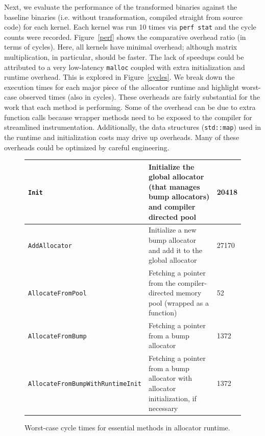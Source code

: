 \documentclass{article}
\begin{document}
Next, we evaluate the performance of the transformed binaries against the baseline binaries (i.e.
without transformation, compiled straight from source code) for each kernel. Each kernel was 
run 10 times via \texttt{perf stat} and the cycle counts were recorded. Figure~\ref{perf} shows the 
comparative overhead ratio (in terms of cycles). Here, all kernels have minimal overhead; although
matrix multiplication, in particular, should be faster. The lack of speedups could be attributed
to a very low-latency \texttt{malloc} coupled with extra initialization and runtime overhead. This
is explored in Figure~\ref{cycles}. We break down the execution times for each major piece of the 
allocator runtime and highlight worst-case observed times (also in cycles). These overheads are
fairly substantial for the work that each method is performing. Some of the overhead can be due
to extra function calls because wrapper methods need to be exposed to the compiler for streamlined
instrumentation. Additionally, the data structures (\texttt{std::map}) used in the runtime and 
initialization costs may drive up overheads. Many of these overheads could be optimized by 
careful engineering.

\begin{figure} [htp]
        \small
        \centering
        \begin{tabular}{ | m{5cm} | m{9cm} | m{1cm} | } 
          \hline
            \texttt{Init} & Initialize the global allocator (that manages bump allocators) and compiler directed pool & 20418 \\ 
          \hline
            \texttt{AddAllocator} & Initialize a new bump allocator and add it to the global allocator & 27170 \\ 
          \hline
            \texttt{AllocateFromPool} & Fetching a pointer from the compiler-directed memory pool (wrapped as a function) & 52 \\ 
          \hline
            \texttt{AllocateFromBump} & Fetching a pointer from a bump allocator & 1372 \\ 
          \hline
            \texttt{AllocateFromBumpWithRuntimeInit} & Fetching a pointer from a bump allocator with allocator initialization, if necessary & 1372 \\ 
          \hline
        \end{tabular}
        \caption{Worst-case cycle times for essential methods in allocator runtime.}
        \label{fig:cycles}
\end{figure}
\end{document}
